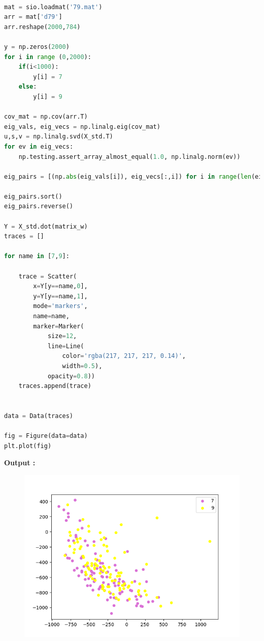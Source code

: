 \documentclass[a4paper, 11pt]{article}
\begin{document}
\begin{lstlisting}[language=python]

mat = sio.loadmat('79.mat')
arr = mat['d79']
arr.reshape(2000,784)

y = np.zeros(2000)
for i in range (0,2000):
    if(i<1000):
        y[i] = 7
    else:
        y[i] = 9

cov_mat = np.cov(arr.T)
eig_vals, eig_vecs = np.linalg.eig(cov_mat)
u,s,v = np.linalg.svd(X_std.T)
for ev in eig_vecs:
    np.testing.assert_array_almost_equal(1.0, np.linalg.norm(ev))

eig_pairs = [(np.abs(eig_vals[i]), eig_vecs[:,i]) for i in range(len(eig_vals))]

eig_pairs.sort()
eig_pairs.reverse()

Y = X_std.dot(matrix_w)
traces = []

for name in [7,9]:

    trace = Scatter(
        x=Y[y==name,0],
        y=Y[y==name,1],
        mode='markers',
        name=name,
        marker=Marker(
            size=12,
            line=Line(
                color='rgba(217, 217, 217, 0.14)',
                width=0.5),
            opacity=0.8))
    traces.append(trace)


data = Data(traces)

fig = Figure(data=data)
plt.plot(fig)


\end{lstlisting}


\textbf{Output :}\\
\begin{figure}[h]
\centering
\includegraphics[width=\linewidth]{PCA}
\end{figure}
\end{document}
